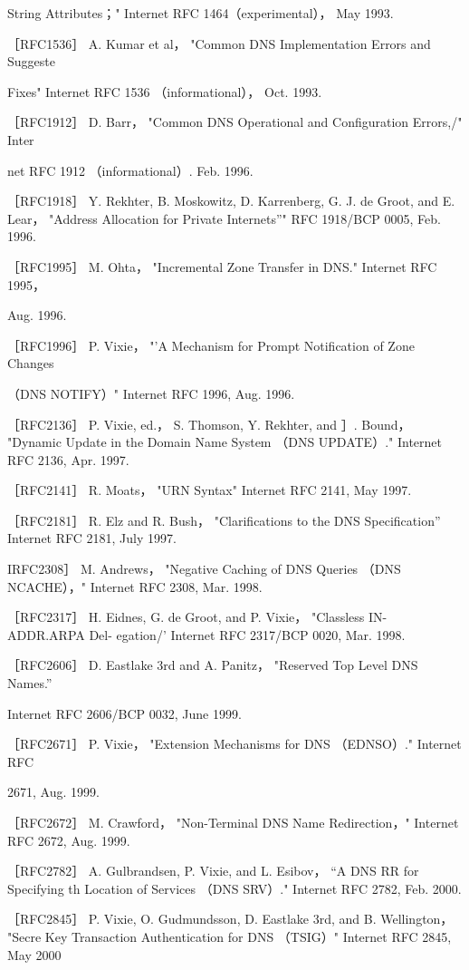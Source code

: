 String Attributes；" Internet RFC 1464（experimental）， May 1993.

［RFC1536］ A. Kumar et al， "Common DNS Implementation Errors and Suggeste

Fixes" Internet RFC 1536 （informational）， Oct. 1993.

［RFC1912］ D. Barr， "Common DNS Operational and Configuration Errors,/" Inter

net RFC 1912 （informational）. Feb. 1996.


［RFC1918］ Y. Rekhter, B. Moskowitz, D. Karrenberg, G. J. de Groot, and E. Lear，
"Address Allocation for Private Internets”" RFC 1918/BCP 0005, Feb. 1996.

［RFC1995］ M. Ohta， "Incremental Zone Transfer in DNS." Internet RFC 1995，

Aug. 1996.

［RFC1996］ P. Vixie， "'A Mechanism for Prompt Notification of Zone Changes

（DNS NOTIFY）" Internet RFC 1996, Aug. 1996.

［RFC2136］ P. Vixie, ed.， S. Thomson, Y. Rekhter, and ］. Bound， "Dynamic Update
in the Domain Name System （DNS UPDATE）." Internet RFC 2136, Apr. 1997.

［RFC2141］ R. Moats， "URN Syntax" Internet RFC 2141, May 1997.

［RFC2181］ R. Elz and R. Bush， "Clarifications to the DNS Specification” Internet
RFC 2181, July 1997.

IRFC2308］ M. Andrews， "Negative Caching of DNS Queries （DNS NCACHE），"
Internet RFC 2308, Mar. 1998.

［RFC2317］ H. Eidnes, G. de Groot, and P. Vixie， "Classless IN-ADDR.ARPA Del-
egation/' Internet RFC 2317/BCP 0020, Mar. 1998.

［RFC2606］ D. Eastlake 3rd and A. Panitz， "Reserved Top Level DNS Names.”

Internet RFC 2606/BCP 0032, June 1999.

［RFC2671］ P. Vixie， "Extension Mechanisms for DNS （EDNSO）." Internet RFC

2671, Aug. 1999.

［RFC2672］ M. Crawford， "Non-Terminal DNS Name Redirection，" Internet RFC
2672, Aug. 1999.

［RFC2782］ A. Gulbrandsen, P. Vixie, and L. Esibov， “A DNS RR for Specifying th
Location of Services （DNS SRV）." Internet RFC 2782, Feb. 2000.

［RFC2845］ P. Vixie, O. Gudmundsson, D. Eastlake 3rd, and B. Wellington， "Secre
Key Transaction Authentication for DNS （TSIG）" Internet RFC 2845, May 2000

